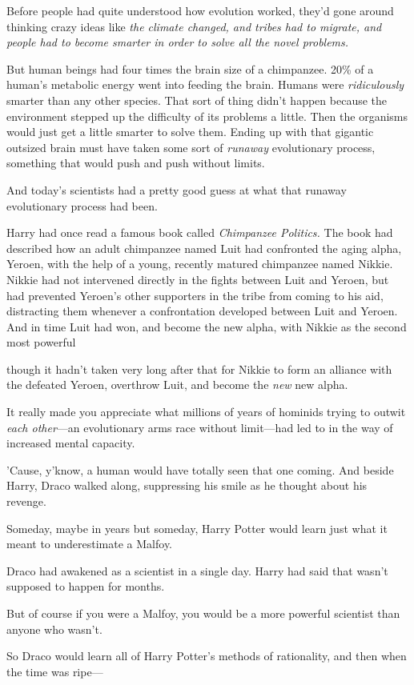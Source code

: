 Before people had quite understood how evolution worked, they'd gone around
thinking crazy ideas like \emph{the climate changed, and tribes had to migrate,
and people had to become smarter in order to solve all the novel problems.}

But human beings had four times the brain size of a chimpanzee. 20\% of a
human's metabolic energy went into feeding the brain. Humans were
\emph{ridiculously} smarter than any other species. That sort of thing didn't
happen because the environment stepped up the difficulty of its problems a
little. Then the organisms would just get a little smarter to solve them.
Ending up with that gigantic outsized brain must have taken some sort of
\emph{runaway} evolutionary process, something that would push and push without
limits.

And today's scientists had a pretty good guess at what that runaway
evolutionary process had been.

Harry had once read a famous book called \emph{Chimpanzee Politics.} The book
had described how an adult chimpanzee named Luit had confronted the aging
alpha, Yeroen, with the help of a young, recently matured chimpanzee named
Nikkie. Nikkie had not intervened directly in the fights between Luit and
Yeroen, but had prevented Yeroen's other supporters in the tribe from coming to
his aid, distracting them whenever a confrontation developed between Luit and
Yeroen. And in time Luit had won, and become the new alpha, with Nikkie as the
second most powerful{\el}

{\el} though it hadn't taken very long after that for Nikkie to form an
alliance with the defeated Yeroen, overthrow Luit, and become the \emph{new}
new alpha.

It really made you appreciate what millions of years of hominids trying to
outwit \emph{each other}---an evolutionary arms race without limit---had led to
in the way of increased mental capacity.

'Cause, y'know, a human would have totally seen that one coming.
\sbreak
And beside Harry, Draco walked along, suppressing his smile as he thought about
his revenge.

Someday, maybe in years but someday, Harry Potter would learn just what it
meant to underestimate a Malfoy.

Draco had awakened as a scientist in a single day. Harry had said that wasn't
supposed to happen for months.

But of course if you were a Malfoy, you would be a more powerful scientist than
anyone who wasn't.

So Draco would learn all of Harry Potter's methods of rationality, and then
when the time was ripe\mbox{---}
